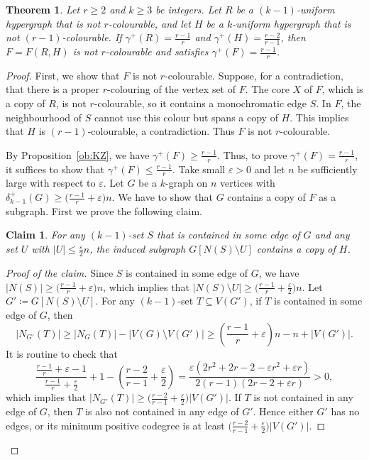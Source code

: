 \documentclass[11pt]{article}
\newcommand{\e}{\varepsilon}
\newtheorem{theorem}{Theorem}
\newtheorem{cla}{Claim}[theorem]
\newenvironment{poc}{\begin{proof}[Proof of the claim]\renewcommand*{\qedsymbol}{$\blacksquare$}}{\end{proof}}
\begin{document}
\begin{theorem}\label{thm: F(R,H)}
Let $r \ge 2$ and $k \ge 3$ be integers.
Let $R$ be a $(k-1)$-uniform hypergraph that is not $r$-colourable, and let $H$ be 
a $k$-uniform hypergraph that is not $(r-1)$-colourable. If $\gamma^+(R) = \frac{r-1}{r}$ 
and $\gamma^+(H) = \frac{r-2}{r-1}$, then $F = F(R,H)$ 
is not $r$-colourable and satisfies $\gamma^+(F) = \frac{r-1}{r}$. 
\end{theorem}
\begin{proof}
    First, we show that $F$ is not $r$-colourable. Suppose, for a contradiction, that there is a proper $r$-colouring of the vertex set of $F$.
    The core $X$ of $F$, which is a copy of $R$, is not $r$-colourable, so it contains a monochromatic edge $S$. 
    In $F$, the neighbourhood of $S$  cannot use this colour but spans a copy of $H$. This implies that $H$ is $(r-1)$-colourable, a contradiction. Thus $F$ is not $r$-colourable.

    By Proposition~\ref{ob:KZ}, we have $\gamma^+(F)\ge \frac{r-1}{r}$. Thus, to prove $\gamma^+(F)=\frac{r-1}{r}$, it suffices to show that $\gamma^+(F)\le \frac{r-1}{r}$.
    Take small $\varepsilon>0$ and let $n$ be sufficiently large with respect to $\varepsilon$. Let $G$ be a $k$-graph on $n$ vertices with $\delta^+_{k-1}(G)\ge \bigl(\frac{r-1}{r}+\varepsilon\bigr)n$.
    We have to show that $G$ contains a copy of $F$ as a subgraph. First we prove the following claim.
    \begin{cla}\label{claim:key}
    For any $(k-1)$-set $S$ that is contained in some edge of $G$ and any set $U$ with $|U|\le \frac{\varepsilon}{2}n$, the induced subgraph $G[N(S)\setminus U]$ contains a copy of $H$.
    \end{cla}
    \begin{poc}
    Since $S$ is contained in some edge of $G$, we have $|N(S)|\ge \bigl(\frac{r-1}{r}+\varepsilon\bigr)n$, which implies that $|N(S)\setminus U|\ge \bigl(\frac{r-1}{r}+\frac{\varepsilon}{2}\bigr)n$. Let $G'\coloneqq G[N(S)\setminus U]$.
    For any $(k-1)$-set $T\subseteq V(G')$, if $T$ is contained in some edge of $G$, then
    \[
    |N_{G'}(T)|\ge |N_G(T)|-|V(G)\setminus V(G')|\ge \left(\frac{r-1}{r}+\varepsilon\right)n-n +|V(G')|.
    \]
    It is routine to check that
    \[
    \frac{\frac {r-1}r + \e-1}{
    \frac{r - 1}{r} + \frac{\e}2}+1 - \left(\frac{r - 2}{r - 1} + \frac{\e}2\right) = \frac{\e \left(2 r^2+2
           r-2-\e r^2+\e r\right)}{2 (r-1) (2 r-2+\e r)}>0,
    \]
    which implies that $|N_{G'}(T)|\ge \bigl(\frac{r-2}{r-1}+\frac{\varepsilon}{2}\bigr)|V(G')|$.
    If $T$ is not contained in any edge of $G$, then $T$ is also not contained in any edge of $G'$. Hence either $G'$ has no edges, or its minimum positive codegree is at least
    $    \bigl(\tfrac{r-2}{r-1}+\tfrac{\varepsilon}{2}\bigr)|V(G')|$.
    

\end{poc}
\end{proof}
\end{document}
